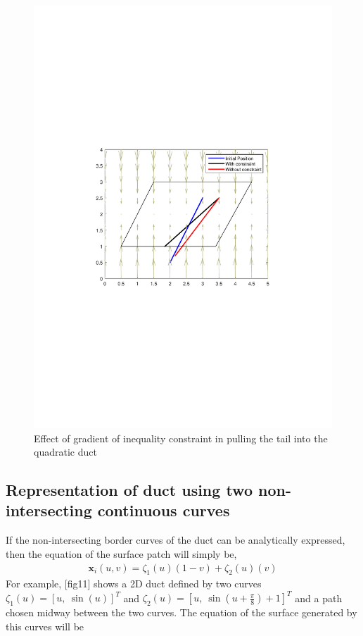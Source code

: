 \documentclass[12pt,a4]{article}
\begin{document}
\begin{figure}[h!]
\centering
\includegraphics[scale=0.5]{figures/fig10b.pdf}
\caption{ Effect of gradient of inequality constraint in pulling the tail into the quadratic duct \label{fig:quadgradient}}
\end{figure}


\subsection{Representation of duct using two non-intersecting continuous curves}
If the non-intersecting border curves of the duct can be analytically expressed, then the equation of the surface patch will simply be,
\begin{align}
\mathbf{x}_i(u,v)= \zeta_1(u)\left(1-{v}\right) +\zeta_2(u)\left({v}\right)
\end{align}
For example, [fig11] shows a 2D duct defined by two curves $\zeta_1(u) = \left[u,~\sin\left(u \right)\right]^T$ and $\zeta_2(u) = \left[u,~\sin\left(u +\frac{\pi}{8}\right)+1\right]^T$ and a path chosen midway between the two curves. The equation of the surface generated by this curves will be
\end{document}
